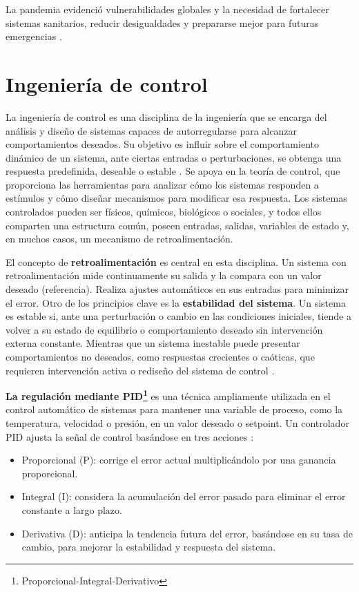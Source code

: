 \begin{enumerate}
La pandemia evidenció vulnerabilidades globales y la necesidad de fortalecer sistemas sanitarios, reducir desigualdades y prepararse mejor para futuras emergencias \cite{miyah2022covid}.

\section{Ingeniería de control}
La ingeniería de control es una disciplina de la ingeniería que se encarga del análisis y diseño de sistemas capaces de autorregularse para alcanzar comportamientos deseados. Su objetivo es influir sobre el comportamiento dinámico de un sistema, ante ciertas entradas o perturbaciones, se obtenga una respuesta predefinida, deseable o estable \cite{tme_ingenieria_control}. Se apoya en la teoría de control, que proporciona las herramientas para analizar cómo los sistemas responden a estímulos y cómo diseñar mecanismos para modificar esa respuesta. Los sistemas controlados pueden ser físicos, químicos, biológicos o sociales, y todos ellos comparten una estructura común, poseen entradas, salidas, variables de estado y, en muchos casos, un mecanismo de retroalimentación.

El concepto de \textbf{retroalimentación} es central en esta disciplina. Un sistema con retroalimentación mide continuamente su salida y la compara con un valor deseado (referencia). Realiza ajustes automáticos en sus entradas para minimizar el error. Otro de los principios clave es la \textbf{estabilidad del sistema}. Un sistema es estable si, ante una perturbación o cambio en las condiciones iniciales, tiende a volver a su estado de equilibrio o comportamiento deseado sin intervención externa constante. Mientras que un sistema inestable puede presentar comportamientos no deseados, como respuestas crecientes o caóticas, que requieren intervención activa o rediseño del sistema de control \cite{ait_ingenieria_control}.


\textbf{La regulación mediante PID\footnote{Proporcional-Integral-Derivativo}} es una técnica ampliamente utilizada en el control automático de sistemas para mantener una variable de proceso, como la temperatura, velocidad o presión, en un valor deseado o setpoint. Un controlador PID ajusta la señal de control basándose en tres acciones \cite{mazzone2002controladores}:
\begin{itemize}
    \item Proporcional (P): corrige el error actual multiplicándolo por una ganancia proporcional.
    \item Integral (I): considera la acumulación del error pasado para eliminar el error constante a largo plazo.
    \item Derivativa (D): anticipa la tendencia futura del error, basándose en su tasa de cambio, para mejorar la estabilidad y respuesta del sistema.
\end{itemize}


\end{enumerate}
